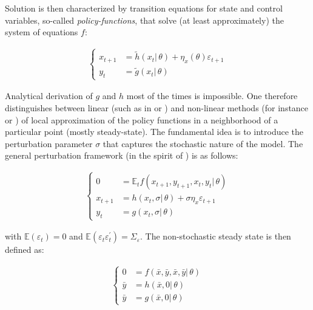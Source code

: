 \documentclass{pracamgr}
\numberwithin{equation}{section}
\begin{document}
Solution is then characterized by transition equations for state and control variables, so-called \textit{policy-functions}, that solve (at least approximately) the system of equations $f$:

\begin{align}
\left\{
\begin{array}{cl}
x_{t+1} &= \widetilde{h} \left( x_{t} | \, \theta \right) + \eta_{x} \left( \theta \right) \varepsilon_{t+1} \\
y_{t} &= \widetilde{g} \left( x_{t} | \, \theta \right)
\end{array}
\right.
\end{align}

Analytical derivation of $g$ and $h$ most of the times is impossible. One therefore distinguishes between linear (such as in \citet{klein2000using} or \citet{sims2002solving}) and non-linear methods (for instance \citet{schmitt2004solving} or \citet{gomme2011second}) of local approximation of the policy functions in a neighborhood of a particular point (mostly steady-state). The fundamental idea is to introduce the perturbation parameter $\sigma$ that captures the stochastic nature of the model. The general perturbation framework (in the spirit of \citet{schmitt2004solving}) is as follows:

\begin{align}
\left\{
\begin{array}{cl}
0 &= \mathbb{E}_{t}f\left(x_{t+1},y_{t+1},x_{t},y_{t} | \, \theta \right) \\
x_{t+1} &= h \left( x_{t}, \sigma | \, \theta \right) + \sigma \eta_{x} \varepsilon_{t+1} \\
y_{t} &= g \left( x_{t}, \sigma | \, \theta \right)
\end{array}
\right.
\end{align}

with $\mathbb{E}(\varepsilon_{t}) = 0$ and $\mathbb{E}(\varepsilon_{t} \varepsilon_{t}^{'} ) = \Sigma_{\varepsilon}$. The non-stochastic steady state is then defined as:

\begin{align}
\left\{
\begin{array}{cl}
0 &= f \left(\bar{x}, \bar{y}, \bar{x}, \bar{y}| \, \theta \right) \\
\bar{y} &= h \left( \bar{x}, 0 | \, \theta \right) \\
\bar{y} &= g \left( \bar{x}, 0 | \, \theta \right)
\end{array}
\right.
\end{align}
\end{document}
